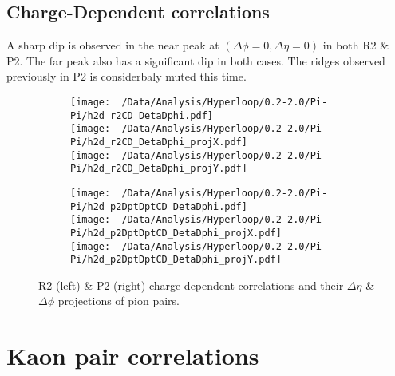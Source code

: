\documentclass[12pt,a4paper,twoside]{report}
\begin{document}
\subsection{Charge-Dependent correlations}
A sharp dip is observed in the near peak at $(\Delta\phi=0,\Delta\eta=0)$ in both R2 \& P2. The far peak also has a significant dip in both cases. The ridges observed previously in P2 is considerbaly muted this time.
\begin{figure}[H]
	\begin{subfigure}{0.49\linewidth}
		\texttt{[image: ~/Data/Analysis/Hyperloop/0.2-2.0/Pi-Pi/h2d\_r2CD\_DetaDphi.pdf]}\\
		\texttt{[image: ~/Data/Analysis/Hyperloop/0.2-2.0/Pi-Pi/h2d\_r2CD\_DetaDphi\_projX.pdf]}\\
		\texttt{[image: ~/Data/Analysis/Hyperloop/0.2-2.0/Pi-Pi/h2d\_r2CD\_DetaDphi\_projY.pdf]}\\
	\end{subfigure}
	\begin{subfigure}{0.49\linewidth}
		\texttt{[image: ~/Data/Analysis/Hyperloop/0.2-2.0/Pi-Pi/h2d\_p2DptDptCD\_DetaDphi.pdf]}\\
		\texttt{[image: ~/Data/Analysis/Hyperloop/0.2-2.0/Pi-Pi/h2d\_p2DptDptCD\_DetaDphi\_projX.pdf]}\\
		\texttt{[image: ~/Data/Analysis/Hyperloop/0.2-2.0/Pi-Pi/h2d\_p2DptDptCD\_DetaDphi\_projY.pdf]}\\
	\end{subfigure}
	\caption{R2 (left) \& P2 (right) charge-dependent correlations and their $\Delta\eta$ \& $\Delta\phi$ projections of pion pairs.}
\end{figure}
\section{Kaon pair correlations}
\end{document}
